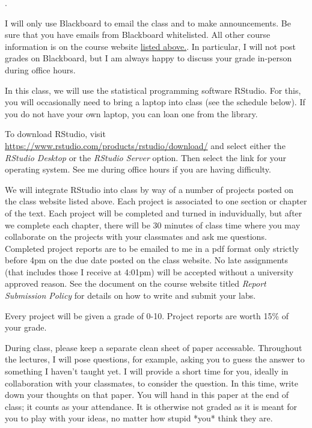 \documentclass{assets/syllabus}
\begin{document}
\Coursetext.


I will only use Blackboard to email the class and to make
announcements.  Be sure that you have emails from Blackboard
whitelisted. All other course information is on the course
website
\href{https://danielmichaelcicala.github.io/teaching}{listed
  above.}.  In particular, I will not post grades on
Blackboard, but I am always happy to discuss your grade in-person
during office hours.


In this class, we will use the statistical programming
software RStudio. For this, you will occasionally need to
bring a laptop into class (see the schedule below). If you
do not have your own laptop, you can loan one from the
library.

To download RStudio, visit
\href{https://www.rstudio.com/products/rstudio/download/}{https://www.rstudio.com/products/rstudio/download/}
and select either the \emph{RStudio Desktop} or the
\emph{RStudio Server} option.  Then select the link for your
operating system.  See me during office hours if you are
having difficulty.

We will integrate RStudio into class by way of a number of
projects posted on the class website listed above. Each
project is associated to one section or chapter of the
text. Each project will be completed and turned in
induvidually, but after we complete each chapter, there will
be 30 minutes of class time where you may collaborate on the
projects with your classmates and ask me questions.
Completed project reports are to be emailed to me in a pdf
format only strictly before 4pm on the due date posted on
the class website. No late assignments (that includes those
I receive at 4:01pm) will be accepted without a university
approved reason. See the document on the course website
titled \emph{Report Submission Policy} for details on how to
write and submit your labs.

Every project will be given a grade of 0-10.  Project
reports are worth 15\% of your grade.




During class, please keep a separate clean sheet of paper
accessable.  Throughout the lectures, I will pose questions,
for example, asking you to guess the answer to something I
haven't taught yet. I will provide a short time for you,
ideally in collaboration with your classmates, to consider
the question. In this time, write down your thoughts on that
paper.  You will hand in this paper at the end of class; it
counts as your attendance. It is otherwise not graded as it
is meant for you to play with your ideas, no matter how
stupid *you* think they are.
\end{document}

